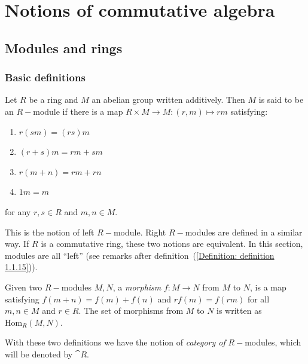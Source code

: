 \chapter{Notions of commutative algebra}

\section{Modules and rings}
\subsection{Basic definitions}
\begin{dang}
    \begin{definition}\cite{curtis1966representation}
        Let $R$ be a ring and $M$ an abelian group written additively. Then $M$ is said to be an $R-$module if there is a map $R\times M\rightarrow M :(r,m)\mapsto rm$ satisfying:
        \begin{enumerate}
            \item[(1)] $r(sm)=(rs)m$
            \item[(2)] $(r+s)m = rm + sm$
            \item[(3)] $r(m+n) = rm+rn$
            \item[(4)] $1m =m$
        \end{enumerate}
        for any $r,s\in R$ and $m,n\in M$.
    \end{definition}
\end{dang}
This is the notion of left $R-$module. Right $R-$modules are defined in a similar way. If $R$ is a commutative ring, these two notions are equivalent. In this section, modules are all ``left'' (see remarks after definition~(\ref{Definition: definition 1.1.15})).
\begin{dang}
    \begin{definition}\cite{curtis1966representation}
        Given two $R-$modules $M,N$, a \textit{morphism} $f: M\rightarrow N$ from $M$ to $N$, is a map satisfying $f(m+n)=f(m)+f(n)$ and $rf(m)=f(rm)$ for all $m,n\in M$ and $r\in R$. The set of morphisms from $M$ to $N$ is written as $\text{Hom}_R(M,N)$. 
    \end{definition}
\end{dang}

\begin{dang}
    \begin{notation}\cite{jacobsonbasic}
        With these two definitions we have the notion of \textit{category of }$R-$modules, which will be denoted by $\cat{R}$.
    \end{notation}
\end{dang}

